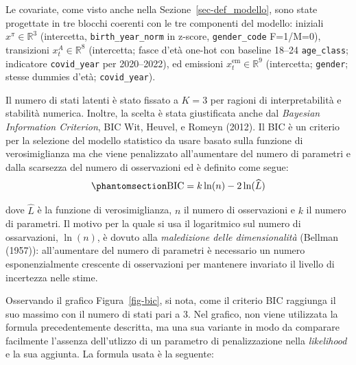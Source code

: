 \documentclass[
  italian,
  a4paper,
  a4paper,
  twoside,
  open=right,
  12pt]{scrbook}
\theoremstyle{definition}
\theoremstyle{remark}
\begin{document}
Le covariate, come visto anche nella Sezione~\ref{sec-def_modello}, sono
state progettate in tre blocchi coerenti con le tre componenti del
modello: iniziali \(x^\pi\in\mathbb{R}^{3}\) (intercetta,
\texttt{birth\_year\_norm} in z-score, \texttt{gender\_code} F=1/M=0),
transizioni \(x^A_t\in\mathbb{R}^{8}\) (intercetta; fasce d'età one-hot
con baseline 18--24 \texttt{age\_class}; indicatore \texttt{covid\_year}
per 2020--2022), ed emissioni \(x^{\text{em}}_t\in\mathbb{R}^{9}\)
(intercetta; \texttt{gender}; stesse dummies d'età;
\texttt{covid\_year}).

\begin{tcolorbox}[enhanced jigsaw, breakable, colframe=quarto-callout-note-color-frame, toprule=.15mm, title=\textcolor{quarto-callout-note-color}{\faInfo}\hspace{0.5em}{Scelta del numero di parametri}, arc=.35mm, colback=white, bottomrule=.15mm, bottomtitle=1mm, colbacktitle=quarto-callout-note-color!10!white, toptitle=1mm, titlerule=0mm, opacityback=0, rightrule=.15mm, opacitybacktitle=0.6, leftrule=.75mm, left=2mm, coltitle=black]

Il numero di stati latenti è stato fissato a \(K=3\) per ragioni di
interpretabilità e stabilità numerica. Inoltre, la scelta è stata
giustificata anche dal \emph{Bayesian Information Criterion}, BIC Wit,
Heuvel, e Romeyn (2012). Il BIC è un criterio per la selezione del
modello statistico da usare basato sulla funzione di verosimiglianza ma
che viene penalizzato all'aumentare del numero di parametri e dalla
scarsezza del numero di osservazioni ed è definito come segue:
\begin{equation}\phantomsection\label{eq-bic}{
\text{BIC} = k\ln(n) - 2\ln(\widehat L)
}\end{equation}

dove \(\widehat L\) è la funzione di verosimiglianza, \(n\) il numero di
osservazioni e \(k\) il numero di parametri. Il motivo per la quale si
usa il logaritmico sul numero di ossarvazioni, \(\ln(n)\), è dovuto alla
\emph{maledizione delle dimensionalità} (Bellman (1957)): all'aumentare
del numero di parametri è necessario un numero esponenzialmente
crescente di osservazioni per mantenere invariato il livello di
incertezza nelle stime.

Osservando il grafico Figura~\ref{fig-bic}, si nota, come il criterio
BIC raggiunga il suo massimo con il numero di stati pari a 3. Nel
grafico, non viene utilizzata la formula precedentemente descritta, ma
una sua variante in modo da comparare facilmente l'assenza dell'utlizzo
di un parametro di penalizzazione nella \emph{likelihood} e la sua
aggiunta. La formula usata è la seguente:


\end{tcolorbox}
\end{document}
